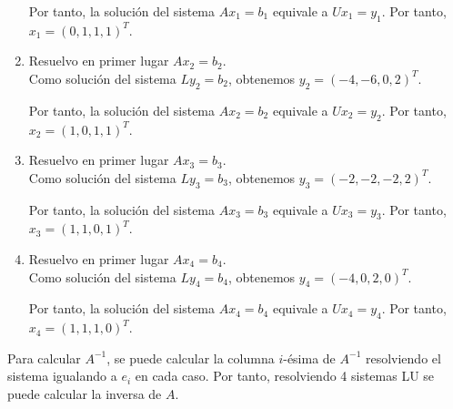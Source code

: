 \begin{ejercicio}
\begin{enumerate}
        Por tanto, la solución del sistema $Ax_1 = b_1$ equivale a $Ux_1 = y_1$. Por tanto, $x_1 = (0,1,1,1)^T$.

        \item Resuelvo en primer lugar $Ax_2 = b_2$.\\
        Como solución del sistema $Ly_2 = b_2$, obtenemos $y_2 = (-4, -6, 0, 2)^T$.

        Por tanto, la solución del sistema $Ax_2 = b_2$ equivale a $Ux_2 = y_2$. Por tanto, $x_2 = (1,0,1,1)^T$.

        \item Resuelvo en primer lugar $Ax_3 = b_3$.\\
        Como solución del sistema $Ly_3 = b_3$, obtenemos $y_3 = (-2, -2, -2, 2)^T$.

        Por tanto, la solución del sistema $Ax_3 = b_3$ equivale a $Ux_3 = y_3$. Por tanto, $x_3 = (1,1,0,1)^T$.

        \item Resuelvo en primer lugar $Ax_4 = b_4$.\\
        Como solución del sistema $Ly_4 = b_4$, obtenemos $y_4 = (-4, 0, 2, 0)^T$.

        Por tanto, la solución del sistema $Ax_4 = b_4$ equivale a $Ux_4 = y_4$. Por tanto, $x_4 = (1,1,1,0)^T$.
        
    \end{enumerate}
    

    Para calcular $A^{-1}$, se puede calcular la columna $i$-ésima de $A^{-1}$ resolviendo el sistema igualando a $e_i$ en cada caso. Por tanto, resolviendo 4 sistemas LU se puede calcular la inversa de $A$.
\end{ejercicio}

